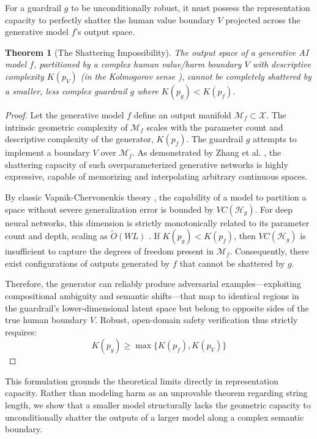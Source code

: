 \documentclass[11pt,twoside,letterpaper]{article}
\newtheorem{theorem}{Theorem}
\begin{document}
For a guardrail $g$ to be unconditionally robust, it must possess the representation capacity to perfectly shatter the human value boundary $V$ projected across the generative model $f$'s output space.

\begin{theorem}[The Shattering Impossibility]
The output space of a generative AI model $f$, partitioned by a complex human value/harm boundary $V$ with descriptive complexity $K(p_V)$ (in the Kolmogorov sense \cite{kolmogorov1965three, chaitin1975theory}), cannot be completely shattered by a smaller, less complex guardrail $g$ where $K(p_g) < K(p_f)$. 
\end{theorem}
\begin{proof}
Let the generative model $f$ define an output manifold $\mathcal{M}_f \subset \mathcal{X}$. The intrinsic geometric complexity of $\mathcal{M}_f$ scales with the parameter count and descriptive complexity of the generator, $K(p_f)$. 
The guardrail $g$ attempts to implement a boundary $V$ over $\mathcal{M}_f$. As demonstrated by Zhang et al. \cite{zhang2017understanding}, the shattering capacity of such overparameterized generative networks is 
highly expressive, capable of memorizing and interpolating arbitrary continuous spaces.

By classic Vapnik-Chervonenkis theory \cite{vapnik1998statistical}, the capability of a model to partition a space without severe generalization error is bounded by $VC(\mathcal{H}_g)$. 
For deep neural networks, this dimension is strictly monotonically related to its parameter count and depth, scaling as $\tilde{O}(WL)$ \cite{bartlett2019nearly}. If $K(p_g) < K(p_f)$, then $VC(\mathcal{H}_g)$ is insufficient to capture the degrees of freedom present in $\mathcal{M}_f$. Consequently, there exist configurations of outputs generated by $f$ that cannot be shattered by $g$.

Therefore, the generator can reliably produce adversarial examples—exploiting compositional ambiguity and semantic shifts—that map to identical regions in the guardrail's lower-dimensional latent space but belong to opposite sides of the true human boundary $V$. Robust, open-domain safety verification thus strictly requires:
\begin{equation}
K(p_g) \geq \max\{K(p_f), K(p_V)\}
\end{equation}
\end{proof}

This formulation grounds the theoretical limits directly in representation capacity. Rather than modeling harm as an unprovable theorem regarding string length, we show that a smaller model structurally lacks the geometric capacity to unconditionally shatter the outputs of a larger model along a complex semantic boundary.
\end{document}
